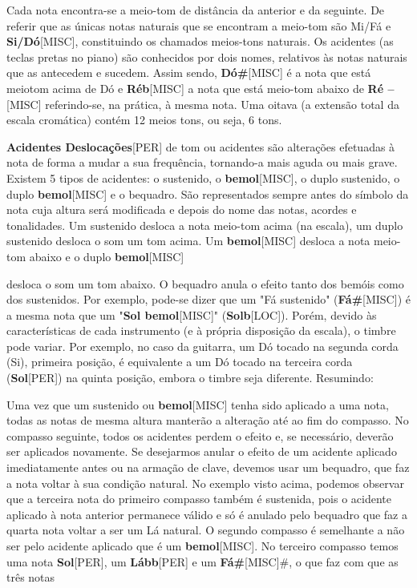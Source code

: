 \documentclass[a4paper,12pt]{article}
\begin{document}
Cada nota encontra-se a meio-tom de distância da anterior e da seguinte. De referir que as únicas notas naturais que se encontram a meio-tom são Mi/Fá e \textbf{Si/Dó}\textsc{[MISC]}, constituindo os chamados meios-tons naturais. Os acidentes (as teclas pretas no piano) são conhecidos por dois nomes, relativos às notas naturais que as antecedem e sucedem. Assim sendo, \textbf{Dó\#}\textsc{[MISC]} é a nota que está meiotom acima de Dó e \textbf{Réb}\textsc{[MISC]} a nota que está meio-tom abaixo de \textbf{Ré --}\textsc{[MISC]} referindo-se, na prática, à mesma nota. Uma oitava (a extensão total da escala cromática) contém 12 meios tons, ou seja, 6 tons.

\textbf{Acidentes Deslocações}\textsc{[PER]} de tom ou acidentes são alterações efetuadas à nota de forma a mudar a sua frequência, tornando-a mais aguda ou mais grave. Existem 5 tipos de acidentes: o sustenido, o \textbf{bemol}\textsc{[MISC]}, o duplo sustenido, o duplo \textbf{bemol}\textsc{[MISC]} e o bequadro. São representados sempre antes do símbolo da nota cuja altura será modificada e depois do nome das notas, acordes e tonalidades. Um sustenido desloca a nota meio-tom acima (na escala), um duplo sustenido desloca o som um tom acima. Um \textbf{bemol}\textsc{[MISC]} desloca a nota meio-tom abaixo e o duplo \textbf{bemol}\textsc{[MISC]}

desloca o som um tom abaixo. O bequadro anula o efeito tanto dos bemóis como dos sustenidos. Por exemplo, pode-se dizer que um "Fá sustenido" (\textbf{Fá\#}\textsc{[MISC]}) é a mesma nota que um "\textbf{Sol bemol}\textsc{[MISC]}" (\textbf{Solb}\textsc{[LOC]}). Porém, devido às características de cada instrumento (e à própria disposição da escala), o timbre pode variar. Por exemplo, no caso da guitarra, um Dó tocado na segunda corda (Si), primeira posição, é equivalente a um Dó tocado na terceira corda (\textbf{Sol}\textsc{[PER]}) na quinta posição, embora o timbre seja diferente. Resumindo:

Uma vez que um sustenido ou \textbf{bemol}\textsc{[MISC]} tenha sido aplicado a uma nota, todas as notas de mesma altura manterão a alteração até ao fim do compasso. No compasso seguinte, todos os acidentes perdem o efeito e, se necessário, deverão ser aplicados novamente. Se desejarmos anular o efeito de um acidente aplicado imediatamente antes ou na armação de clave, devemos usar um bequadro, que faz a nota voltar à sua condição natural. No exemplo visto acima, podemos observar que a terceira nota do primeiro compasso também é sustenida, pois o acidente aplicado à nota anterior permanece válido e só é anulado pelo bequadro que faz a quarta nota voltar a ser um Lá natural. O segundo compasso é semelhante a não ser pelo acidente aplicado que é um \textbf{bemol}\textsc{[MISC]}. No terceiro compasso temos uma nota \textbf{Sol}\textsc{[PER]}, um \textbf{Lább}\textsc{[PER]} e um \textbf{Fá\#}\textsc{[MISC]}\#, o que faz com que as três notas
\end{document}
